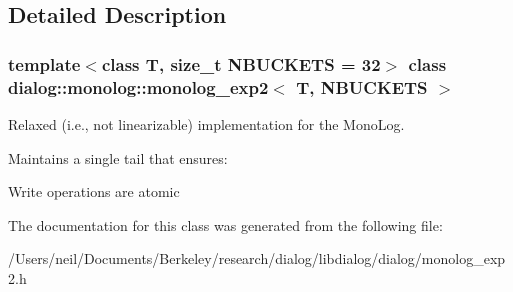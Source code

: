 \subsection{Detailed Description}
\subsubsection*{template$<$class T, size\+\_\+t N\+B\+U\+C\+K\+E\+TS = 32$>$\newline
class dialog\+::monolog\+::monolog\+\_\+exp2$<$ T, N\+B\+U\+C\+K\+E\+T\+S $>$}

Relaxed (i.\+e., not linearizable) implementation for the Mono\+Log.

Maintains a single tail that ensures\+:
\begin{DoxyItemize}
\item Write operations are atomic 
\end{DoxyItemize}

The documentation for this class was generated from the following file\+:\begin{DoxyCompactItemize}
\item 
/\+Users/neil/\+Documents/\+Berkeley/research/dialog/libdialog/dialog/monolog\+\_\+exp2.\+h\end{DoxyCompactItemize}

